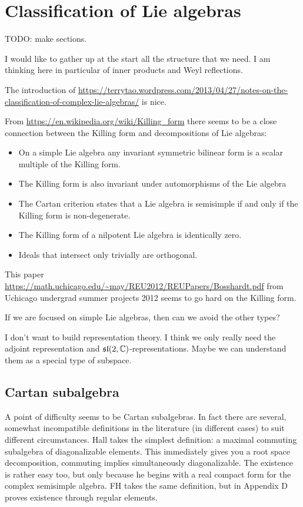 

\section{Classification of Lie algebras}

TODO: make sections.

I would like to gather up at the start all the structure that we need. I am thinking here in particular of inner products and Weyl reflections.

The introduction of \url{https://terrytao.wordpress.com/2013/04/27/notes-on-the-classification-of-complex-lie-algebras/} is nice.

From \url{https://en.wikipedia.org/wiki/Killing_form} there seems to be a close connection between the Killing form and decompositions of Lie algebras:
\begin{itemize}
\item On a simple Lie algebra any invariant symmetric bilinear form is a scalar multiple of the Killing form.
\item The Killing form is also invariant under automorphisms of the Lie algebra
\item The Cartan criterion states that a Lie algebra is semisimple if and only if the Killing form is non-degenerate.
\item The Killing form of a nilpotent Lie algebra is identically zero.
\item Ideals that intersect only trivially are orthogonal.
\end{itemize}
This paper \url{https://math.uchicago.edu/~may/REU2012/REUPapers/Bosshardt.pdf} from Uchicago undergrad summer projects 2012 seems to go hard on the Killing form.

If we are focused on simple Lie algebras, then can we avoid the other types?

I don't want to build representation theory.
I think we only really need the adjoint representation and $\mathfrak{sl}(2,\mathbb{C})$-representations.
Maybe we can understand them as a special type of subspace.


\subsection{Cartan subalgebra}
A point of difficulty seems to be Cartan subalgebras.
In fact there are several, somewhat incompatible definitions in the literature (in different cases) to suit different circumstances.
Hall takes the simplest definition: a maximal commuting subalgebra of diagonalizable elements.
This immediately gives you a root space decomposition, commuting implies simultaneously diagonalizable.
The existence is rather easy too, but only because he begins with a real compact form for the complex semisimple algebra.
FH takes the same definition, but in Appendix D proves existence through regular elements.

